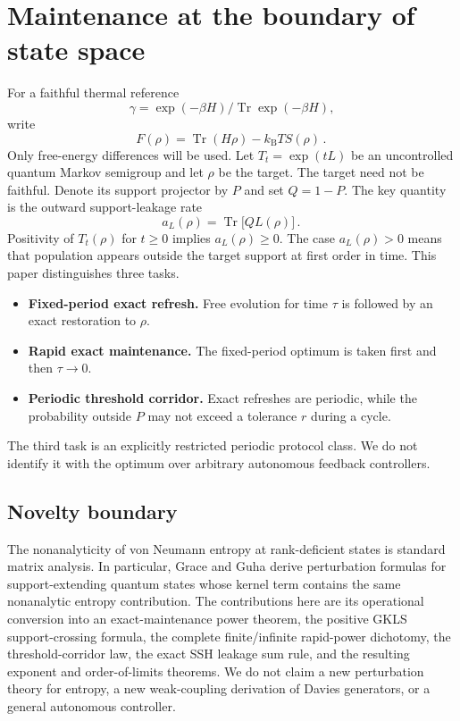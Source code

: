 \documentclass[11pt,a4paper]{article}
\theoremstyle{remark}
\begin{document}
\section{Maintenance at the boundary of state space}
For a faithful thermal reference
\[
\gamma=\exp(-\beta H)/\operatorname{Tr} \exp(-\beta H)\mathpunct{,}
\]
write
\[
F(\rho)=\operatorname{Tr}(H \rho)-k_{\mathrm B} T S(\rho)\mathpunct{.}
\]
Only free-energy differences will be used. Let $T_t=\exp(tL)$ be an uncontrolled quantum Markov semigroup and let $\rho$ be the target. The target need not be faithful. Denote its support projector by $P$ and set $Q=1-P$.
The key quantity is the outward support-leakage rate
\[
a_L(\rho)=\operatorname{Tr}\bigl[Q L(\rho)\bigr]\mathpunct{.}
\]
Positivity of $T_t(\rho)$ for $t\ge 0$ implies $a_L(\rho)\ge 0$. The case $a_L(\rho)>0$ means that population appears outside the target support at first order in time.
This paper distinguishes three tasks.
\begin{itemize}
\item \textbf{Fixed-period exact refresh.} Free evolution for time $\tau$ is followed by an exact restoration to $\rho$.
\item \textbf{Rapid exact maintenance.} The fixed-period optimum is taken first and then $\tau\to 0$.
\item \textbf{Periodic threshold corridor.} Exact refreshes are periodic, while the probability outside $P$ may not exceed a tolerance $r$ during a cycle.
\end{itemize}
The third task is an explicitly restricted periodic protocol class. We do not identify it with the optimum over arbitrary autonomous feedback controllers.
\subsection{Novelty boundary}
The nonanalyticity of von Neumann entropy at rank-deficient states is standard matrix analysis. In particular, Grace and Guha derive perturbation formulas for support-extending quantum states whose kernel term contains the same nonanalytic entropy contribution. The contributions here are its operational conversion into an exact-maintenance power theorem, the positive GKLS support-crossing formula, the complete finite/infinite rapid-power dichotomy, the threshold-corridor law, the exact SSH leakage sum rule, and the resulting exponent and order-of-limits theorems. We do not claim a new perturbation theory for entropy, a new weak-coupling derivation of Davies generators, or a general autonomous controller.
\end{document}

